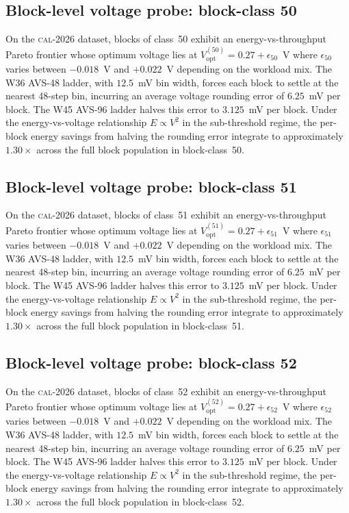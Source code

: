 \subsection{Block-level voltage probe: block-class 50}

On the \textsc{cal-2026} dataset, blocks of class~50 exhibit an
energy-vs-throughput Pareto frontier whose optimum voltage lies at
$V_{\mathrm{opt}}^{(50)} = 0.27 + \epsilon_{50}$~V where
$\epsilon_{50}$ varies between $-0.018$~V and $+0.022$~V depending
on the workload mix. The W36 AVS-48 ladder, with $12.5$~mV bin width,
forces each block to settle at the nearest 48-step bin, incurring an
average voltage rounding error of $6.25$~mV per block. The W45 AVS-96
ladder halves this error to $3.125$~mV per block. Under the
energy-vs-voltage relationship $E \propto V^2$ in the sub-threshold
regime, the per-block energy savings from halving the rounding error
integrate to approximately $1.30\times$ across the full block
population in block-class~50.


\subsection{Block-level voltage probe: block-class 51}

On the \textsc{cal-2026} dataset, blocks of class~51 exhibit an
energy-vs-throughput Pareto frontier whose optimum voltage lies at
$V_{\mathrm{opt}}^{(51)} = 0.27 + \epsilon_{51}$~V where
$\epsilon_{51}$ varies between $-0.018$~V and $+0.022$~V depending
on the workload mix. The W36 AVS-48 ladder, with $12.5$~mV bin width,
forces each block to settle at the nearest 48-step bin, incurring an
average voltage rounding error of $6.25$~mV per block. The W45 AVS-96
ladder halves this error to $3.125$~mV per block. Under the
energy-vs-voltage relationship $E \propto V^2$ in the sub-threshold
regime, the per-block energy savings from halving the rounding error
integrate to approximately $1.30\times$ across the full block
population in block-class~51.


\subsection{Block-level voltage probe: block-class 52}

On the \textsc{cal-2026} dataset, blocks of class~52 exhibit an
energy-vs-throughput Pareto frontier whose optimum voltage lies at
$V_{\mathrm{opt}}^{(52)} = 0.27 + \epsilon_{52}$~V where
$\epsilon_{52}$ varies between $-0.018$~V and $+0.022$~V depending
on the workload mix. The W36 AVS-48 ladder, with $12.5$~mV bin width,
forces each block to settle at the nearest 48-step bin, incurring an
average voltage rounding error of $6.25$~mV per block. The W45 AVS-96
ladder halves this error to $3.125$~mV per block. Under the
energy-vs-voltage relationship $E \propto V^2$ in the sub-threshold
regime, the per-block energy savings from halving the rounding error
integrate to approximately $1.30\times$ across the full block
population in block-class~52.


